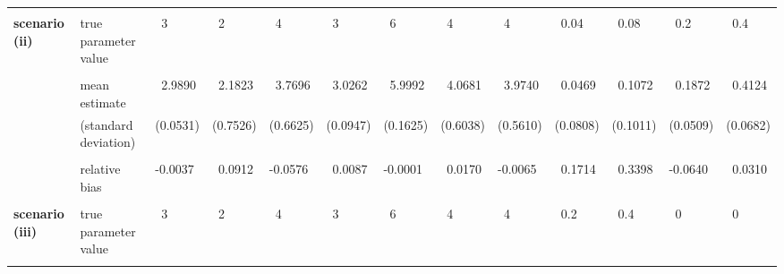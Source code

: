 \documentclass[11pt]{article}
\begin{document}
\begin{sidewaystable}[!p]
\begin{center}
{\begin{tabular}{|l|l|lllllllllll|}
\\ \hline \vspace*{-2mm} & & & & & & & & & & & & \\
 {\bf scenario (ii)} & true parameter value & ~3 & ~2 & ~4 & ~3 & ~6 & ~4 & ~4 & ~0.04 & ~0.08 & ~0.2 & ~0.4 
\\ \vspace*{-2mm} & & & & & & & & & & & & \\ 
& mean estimate & ~2.9890 & ~2.1823 & ~3.7696 & ~3.0262 & ~5.9992 & ~4.0681 & ~3.9740 & ~0.0469 & ~0.1072 & ~0.1872 & ~0.4124 \\
& (standard deviation) & (0.0531) & (0.7526) & (0.6625) & (0.0947) & (0.1625) & (0.6038) & (0.5610) & (0.0808) & (0.1011) & (0.0509) & (0.0682)
\\ \vspace*{-2mm} & & & & & & & & & & & & \\
& relative bias & -0.0037 & ~0.0912 & -0.0576 & ~0.0087 & -0.0001 & ~0.0170 & -0.0065 & ~0.1714 & ~0.3398 & -0.0640 & ~0.0310
\\ \hline \vspace*{-2mm} & & & & & & & & & & & & \\
 {\bf scenario (iii)} & true parameter value & ~3 & ~2 & ~4 & ~3 & ~6 & ~4 & ~4 & ~0.2 & ~0.4 & ~0 & ~0
\\ \vspace*{-2mm} & & & & & & & & & & & & \\ 

\end{tabular}}
\end{center}
\end{sidewaystable}
\end{document}
